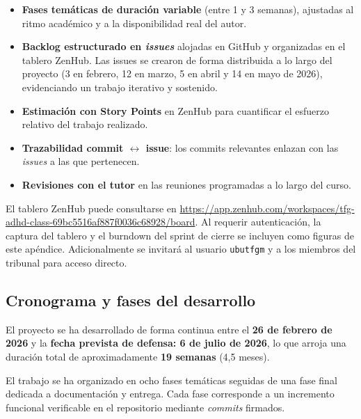 \begin{itemize}
    \item \textbf{Fases temáticas de duración variable} (entre 1 y 3 semanas), ajustadas al ritmo académico y a la disponibilidad real del autor.
    \item \textbf{Backlog estructurado en \emph{issues}} alojadas en GitHub y organizadas en el tablero ZenHub. Las issues se crearon de forma distribuida a lo largo del proyecto (3 en febrero, 12 en marzo, 5 en abril y 14 en mayo de 2026), evidenciando un trabajo iterativo y sostenido.
    \item \textbf{Estimación con Story Points} en ZenHub para cuantificar el esfuerzo relativo del trabajo realizado.
    \item \textbf{Trazabilidad commit $\leftrightarrow$ issue}: los commits relevantes enlazan con las \emph{issues} a las que pertenecen.
    \item \textbf{Revisiones con el tutor} en las reuniones programadas a lo largo del curso.
\end{itemize}

El tablero ZenHub puede consultarse en \url{https://app.zenhub.com/workspaces/tfg-adhd-class-69bc5516af887f0036c68928/board}. Al requerir autenticación, la captura del tablero y el burndown del sprint de cierre se incluyen como figuras de este apéndice. Adicionalmente se invitará al usuario \texttt{ubutfgm} y a los miembros del tribunal para acceso directo.

\subsection{Cronograma y fases del desarrollo}

El proyecto se ha desarrollado de forma continua entre el \textbf{26 de febrero de 2026} y la \textbf{fecha prevista de defensa: 6 de julio de 2026}, lo que arroja una duración total de aproximadamente \textbf{19 semanas} (4,5 meses).

El trabajo se ha organizado en ocho fases temáticas seguidas de una fase final dedicada a documentación y entrega. Cada fase corresponde a un incremento funcional verificable en el repositorio mediante \emph{commits} firmados.

